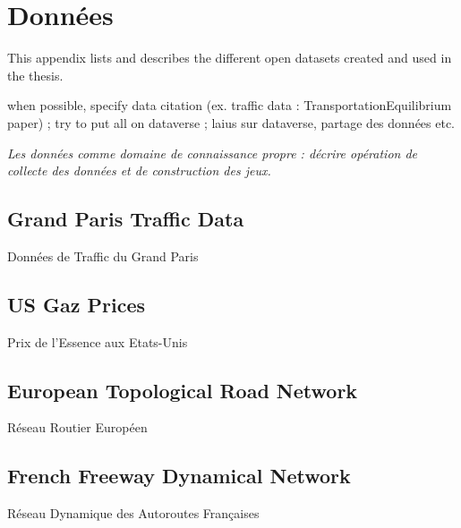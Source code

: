 \chapter{Données}

\label{app:data} %



\headercit{}{}{}



This appendix lists and describes the different open datasets created and used in the thesis.

when possible, specify data citation (ex. traffic data : TransportationEquilibrium paper) ; try to put all on dataverse ; laius sur dataverse, partage des données etc.

\textit{Les données comme domaine de connaissance propre : décrire opération de collecte des données et de construction des jeux.}

\section{Grand Paris Traffic Data}{Données de Traffic du Grand Paris}





\section{US Gaz Prices}{Prix de l'Essence aux Etats-Unis}




\section{European Topological Road Network}{Réseau Routier Européen}




\section{French Freeway Dynamical Network}{Réseau Dynamique des Autoroutes Françaises}




